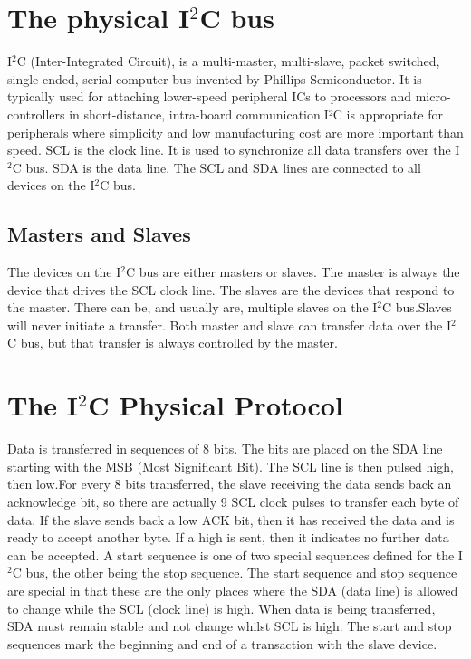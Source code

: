 \documentclass[12pt,twocolumn]{IEEEtran}
\begin{document}
    \section{The physical I$^{2}$C bus}
    I$^{2}$C (Inter-Integrated Circuit),  is a multi-master, multi-slave, packet switched, single-ended, serial computer bus invented by Phillips Semiconductor. It is typically used for attaching lower-speed peripheral ICs to processors and micro-controllers in short-distance, intra-board communication.I²C is appropriate for peripherals where simplicity and low manufacturing cost are more important than speed. \newline SCL is the clock line. It is used to synchronize all data transfers over the I$^{2}$C bus. SDA is the data line. The SCL and SDA lines are connected to all devices on the I$^{2}$C bus.

  \subsection{Masters and Slaves}
      The devices on the I$^{2}$C bus are either masters or slaves. The master is always the device that drives the SCL clock line. The slaves are the devices that 
      respond to the master. There can be, and usually are, multiple slaves on the I$^{2}$C bus.Slaves will never initiate a transfer. Both master and slave can transfer 
      data over the I$^{2}$C bus, but that transfer is always controlled by the master.
  
  \section{The I$^{2}$C Physical Protocol}

    Data is transferred in sequences of 8 bits. The bits are placed on the SDA line starting with the MSB (Most Significant Bit). The SCL line is then pulsed high, then low.For every 8 bits transferred, the slave receiving the data sends back an acknowledge bit, so there are actually 9 SCL clock pulses to transfer each byte of data. If the slave sends back a low ACK bit, then it has received the data and is ready to accept another byte. If a high is sent, then it indicates no further data can be accepted. 
A start sequence is one of two special sequences defined for the I$^{2}$C bus, the other being the stop sequence. The start sequence and stop sequence are special in that these are the only places where the SDA (data line) is allowed to change while the SCL (clock line) is high. When data is being transferred, SDA must remain stable and not change whilst SCL is high. The start and stop sequences mark the beginning and end of a transaction with the slave device.
\end{document}
